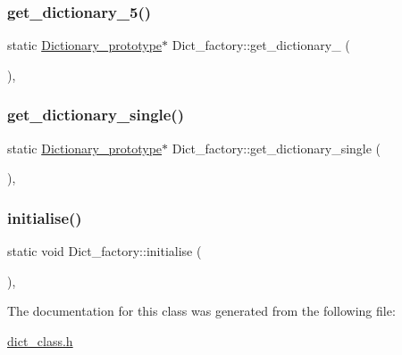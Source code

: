 \mbox{\label{class_dict__factory_ac43e0008908230adcf3fea22a37b587b}} 
\subsubsection{\texorpdfstring{get\_dictionary\_5()}{get\_dictionary\_5()}}
{\footnotesize\ttfamily static \mbox{\hyperlink{class_dictionary__prototype}{Dictionary\+\_\+prototype}}$\ast$ Dict\+\_\+factory\+::get\+\_\+dictionary\+\_ (\begin{DoxyParamCaption}{ }\end{DoxyParamCaption})\hspace{0.3cm}{\ttfamily [inline]}, {\ttfamily [static]}}

\mbox{\label{class_dict__factory_ad9453e2fa9b934df9f19b306a3d81b5e}} 
\subsubsection{\texorpdfstring{get\_dictionary\_single()}{get\_dictionary\_single()}}
{\footnotesize\ttfamily static \mbox{\hyperlink{class_dictionary__prototype}{Dictionary\+\_\+prototype}}$\ast$ Dict\+\_\+factory\+::get\+\_\+dictionary\+\_\+single (\begin{DoxyParamCaption}{ }\end{DoxyParamCaption})\hspace{0.3cm}{\ttfamily [inline]}, {\ttfamily [static]}}

\mbox{\label{class_dict__factory_a86303714c3e434606f3a5e64cbb1c73f}} 
\subsubsection{\texorpdfstring{initialise()}{initialise()}}
{\footnotesize\ttfamily static void Dict\+\_\+factory\+::initialise (\begin{DoxyParamCaption}{ }\end{DoxyParamCaption})\hspace{0.3cm}{\ttfamily [inline]}, {\ttfamily [static]}}



The documentation for this class was generated from the following file\+:\begin{DoxyCompactItemize}
\item 
\mbox{\hyperlink{dict__class_8h}{dict\+\_\+class.\+h}}\end{DoxyCompactItemize}
